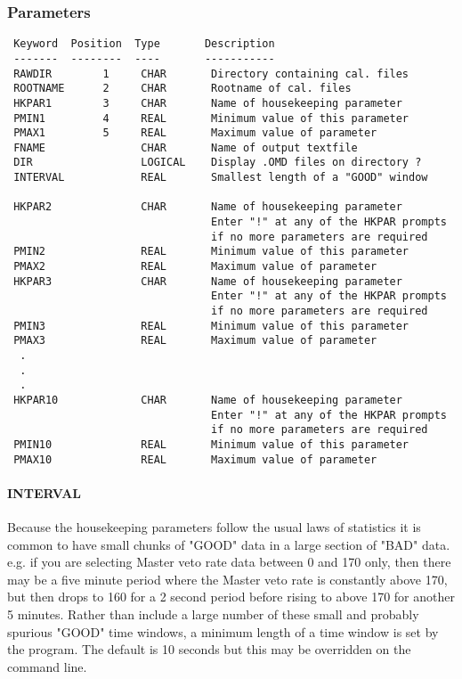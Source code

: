 \documentclass{book}
\renewcommand{\_}{{\tt\char'137}}     %
\begin{document}
\subsubsection{Parameters}
\begin{verbatim}
 Keyword  Position  Type       Description
 -------  --------  ----       -----------
 RAWDIR        1     CHAR       Directory containing cal. files
 ROOTNAME      2     CHAR       Rootname of cal. files
 HKPAR1        3     CHAR       Name of housekeeping parameter
 PMIN1         4     REAL       Minimum value of this parameter
 PMAX1         5     REAL       Maximum value of parameter
 FNAME               CHAR       Name of output textfile
 DIR                 LOGICAL    Display .OMD files on directory ?
 INTERVAL            REAL       Smallest length of a "GOOD" window

 HKPAR2              CHAR       Name of housekeeping parameter
                                Enter "!" at any of the HKPAR prompts
                                if no more parameters are required
 PMIN2               REAL       Minimum value of this parameter
 PMAX2               REAL       Maximum value of parameter
 HKPAR3              CHAR       Name of housekeeping parameter
                                Enter "!" at any of the HKPAR prompts
                                if no more parameters are required
 PMIN3               REAL       Minimum value of this parameter
 PMAX3               REAL       Maximum value of parameter
  .
  .
  .
 HKPAR10             CHAR       Name of housekeeping parameter
                                Enter "!" at any of the HKPAR prompts
                                if no more parameters are required
 PMIN10              REAL       Minimum value of this parameter
 PMAX10              REAL       Maximum value of parameter

\end{verbatim}\paragraph{INTERVAL}
Because the housekeeping parameters follow the usual laws of
statistics it is common to have small chunks of "GOOD" data in a
large section of "BAD" data. e.g. if you are selecting Master veto
rate data between 0 and 170 only, then there may be a five minute
period where the Master veto rate is constantly above 170, but then
drops to 160 for a 2 second period before rising to above 170 for
another 5 minutes. Rather than include a large number of these
small and probably spurious "GOOD" time windows, a minimum length
of a time window is set by the program. The default is 10 seconds
but this may be overridden on the command line.
\end{document}
